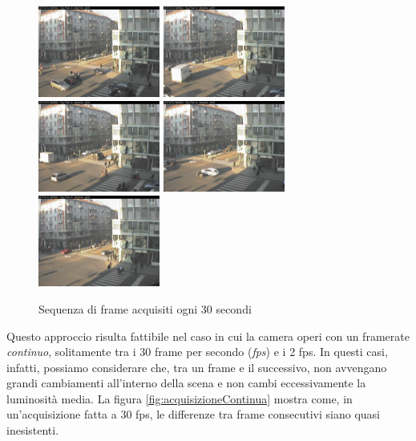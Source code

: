 \begin{figure}
	\includegraphics[width = 4cm]{./pictures/FPSbasso/image2698}
	\includegraphics[width = 4cm]{./pictures/FPSbasso/image2699}
	\includegraphics[width = 4cm]{./pictures/FPSbasso/image2700}
	\includegraphics[width = 4cm]{./pictures/FPSbasso/image2701}
	\includegraphics[width = 4cm]{./pictures/FPSbasso/image2702}
	\caption{Sequenza di frame acquisiti ogni 30 secondi}
	\label{fig:acquisizioneBassa}
\end{figure}
Questo approccio risulta fattibile nel caso in cui la camera operi con un framerate \textit{continuo}, solitamente tra i 30 frame per secondo (\textit{fps}) e i 2 fps. 
In questi casi, infatti, possiamo considerare che, tra un frame e il successivo, non avvengano grandi cambiamenti all'interno della scena e non cambi eccessivamente la luminosit\`a media.
La figura \ref{fig:acquisizioneContinua} mostra come, in un'acquisizione fatta a 30 fps, le differenze tra frame consecutivi siano quasi inesistenti. 
